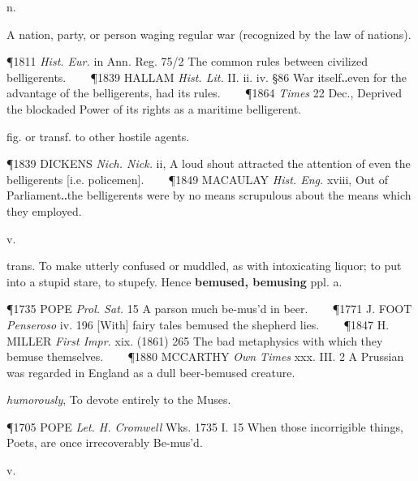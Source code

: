 \begin{description}[wide, labelwidth=!, labelindent=0pt]
\begin{myenumerate}
 n.

 A nation, party, or person waging regular war (recognized by the law of nations).

\P 1811 \textit{Hist. Eur.} in Ann. Reg. 75/2 The common rules between civilized belligerents.    
\P 1839 HALLAM  \textit{Hist. Lit.} II. ii. iv. §86 War itself‥even for the advantage of the belligerents, had its rules.    
\P 1864  \textit{Times} 22 Dec., Deprived the blockaded Power of its rights as a maritime belligerent.

 fig. or transf. to other hostile agents.

\P 1839 DICKENS  \textit{Nich. Nick.} ii, A loud shout attracted the attention of even the belligerents [i.e. policemen].    
\P 1849 MACAULAY  \textit{Hist. Eng.} xviii, Out of Parliament‥the belligerents were by no means scrupulous about the means which they employed.
\end{myenumerate}


 v.

\noindent {}


\noindent
trans. To make utterly confused or muddled, as with intoxicating liquor; to put
into a stupid stare, to stupefy. Hence \textbf{bemused, bemusing} ppl. a.

\P 1735 POPE  \textit{Prol. Sat.} 15 A parson much be-mus'd in beer.    
\P 1771 J. FOOT  \textit{Penseroso} iv. 196 [With] fairy tales bemused the shepherd lies.    
\P 1847 H. MILLER  \textit{First Impr.} xix. (1861) 265 The bad metaphysics with which they bemuse themselves.    
\P 1880 MCCARTHY  \textit{Own Times} xxx. III. 2 A Prussian was regarded in England as a dull beer-bemused creature.

\vspace{0.1cm} \noindent 
\textit{humorously}, To devote entirely to the Muses.

\P 1705 POPE  \textit{Let. H. Cromwell} Wks. 1735 I. 15 When those incorrigible things, Poets, are once irrecoverably Be-mus'd.


 v.

\noindent {}

\vspace{-0.3cm}

\begin{myenumerate}


\end{myenumerate}
\end{description}
